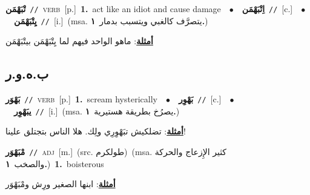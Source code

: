 \documentclass[10pt,a4paper,twoside]{article} %
\begin{document}
\begin{multicols}{2}
{\setlength\topsep{0pt}\textbf{\foreignlanguage{arabic}{تْبَهْمَن}}\ {\color{gray}\texttt{//}\color{black}}\ \textsc{verb}\ [p.]\ \textbf{1.}~act like an idiot and cause damage\ \ $\bullet$\ \ \setlength\topsep{0pt}\textbf{\foreignlanguage{arabic}{اِتْبَهْمَن}}\ {\color{gray}\texttt{//}\color{black}}\ [c.]\ \ $\bullet$\ \ \setlength\topsep{0pt}\textbf{\foreignlanguage{arabic}{يِتْبَهْمَن}}\ {\color{gray}\texttt{//}\color{black}}\ [i.]\ \color{gray}(msa. \foreignlanguage{arabic}{يتصرَّف كالغبي ويتسبب بدمار}~\foreignlanguage{arabic}{\textbf{١.}})\color{black}\  \begin{flushright}\color{gray}\foreignlanguage{arabic}{\textbf{\underline{\foreignlanguage{arabic}{أمثلة}}}: ماهو الواحد فيهم لما يِتْبَهْمَن بيتْبَهْمَن}\end{flushright}\color{black}} \vspace{2mm}

\vspace{-3mm}
\subsection*{\color{blue}\foreignlanguage{arabic}{ب.ه.و.ر}\color{blue}{}} 

{\setlength\topsep{0pt}\textbf{\foreignlanguage{arabic}{بَهْوَر}}\ {\color{gray}\texttt{//}\color{black}}\ \textsc{verb}\ [p.]\ \textbf{1.}~scream hysterically\ \ $\bullet$\ \ \setlength\topsep{0pt}\textbf{\foreignlanguage{arabic}{بَهْوِر}}\ {\color{gray}\texttt{//}\color{black}}\ [c.]\ \ $\bullet$\ \ \setlength\topsep{0pt}\textbf{\foreignlanguage{arabic}{يبَهْوِر}}\ {\color{gray}\texttt{//}\color{black}}\ [i.]\ \color{gray}(msa. \foreignlanguage{arabic}{يصرُخ بطريقة هستيرية}~\foreignlanguage{arabic}{\textbf{١.}})\color{black}\  \begin{flushright}\color{gray}\foreignlanguage{arabic}{\textbf{\underline{\foreignlanguage{arabic}{أمثلة}}}: تضلكيش تبَهْوِرِي ولِك. هلا الناس بتجتلق علينا!}\end{flushright}\color{black}} \vspace{2mm}

{\setlength\topsep{0pt}\textbf{\foreignlanguage{arabic}{مْبَهْوَر}}\ {\color{gray}\texttt{//}\color{black}}\ \textsc{adj}\ [m.]\ (src. \color{gray}\foreignlanguage{arabic}{طولكرم}\color{black})\ \color{gray}(msa. \foreignlanguage{arabic}{كثير الإِزعاج والحركة والصخب}~\foreignlanguage{arabic}{\textbf{١.}})\color{black}\ \textbf{1.}~boisterous\  \begin{flushright}\color{gray}\foreignlanguage{arabic}{\textbf{\underline{\foreignlanguage{arabic}{أمثلة}}}: ابنها الصغير ورِش ومْبَهْوَر}\end{flushright}\color{black}} \vspace{2mm}


\end{multicols}
\end{document}
